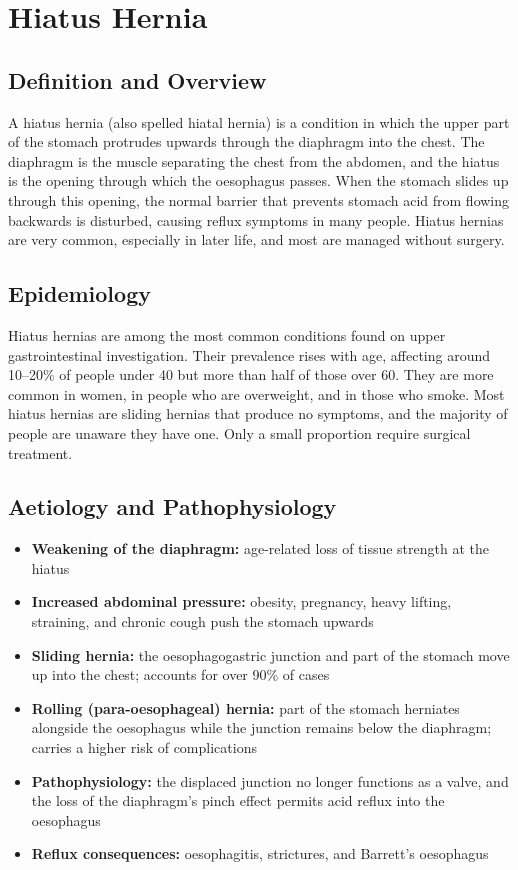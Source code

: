 \chapter{Hiatus Hernia}

\section*{Definition and Overview}
A hiatus hernia (also spelled hiatal hernia) is a condition in which the upper part of the stomach protrudes upwards through the diaphragm into the chest. The diaphragm is the muscle separating the chest from the abdomen, and the hiatus is the opening through which the oesophagus passes. When the stomach slides up through this opening, the normal barrier that prevents stomach acid from flowing backwards is disturbed, causing reflux symptoms in many people. Hiatus hernias are very common, especially in later life, and most are managed without surgery.

\section*{Epidemiology}
Hiatus hernias are among the most common conditions found on upper gastrointestinal investigation. Their prevalence rises with age, affecting around 10--20\% of people under 40 but more than half of those over 60. They are more common in women, in people who are overweight, and in those who smoke. Most hiatus hernias are sliding hernias that produce no symptoms, and the majority of people are unaware they have one. Only a small proportion require surgical treatment.

\section*{Aetiology and Pathophysiology}
\begin{itemize}
    \item \textbf{Weakening of the diaphragm:} age-related loss of tissue strength at the hiatus
    \item \textbf{Increased abdominal pressure:} obesity, pregnancy, heavy lifting, straining, and chronic cough push the stomach upwards
    \item \textbf{Sliding hernia:} the oesophagogastric junction and part of the stomach move up into the chest; accounts for over 90\% of cases
    \item \textbf{Rolling (para-oesophageal) hernia:} part of the stomach herniates alongside the oesophagus while the junction remains below the diaphragm; carries a higher risk of complications
    \item \textbf{Pathophysiology:} the displaced junction no longer functions as a valve, and the loss of the diaphragm's pinch effect permits acid reflux into the oesophagus
    \item \textbf{Reflux consequences:} oesophagitis, strictures, and Barrett's oesophagus
\end{itemize}

